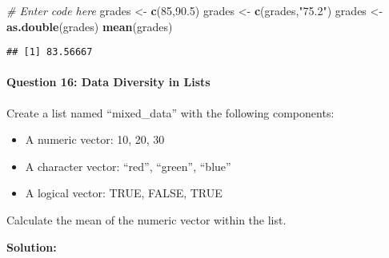 \documentclass[
]{article}
\newenvironment{Shaded}{\begin{snugshade}}{\end{snugshade}}
\newcommand{\AttributeTok}[1]{\textcolor[rgb]{0.13,0.29,0.53}{#1}}
\newcommand{\CommentTok}[1]{\textcolor[rgb]{0.56,0.35,0.01}{\textit{#1}}}
\newcommand{\ConstantTok}[1]{\textcolor[rgb]{0.56,0.35,0.01}{#1}}
\newcommand{\DecValTok}[1]{\textcolor[rgb]{0.00,0.00,0.81}{#1}}
\newcommand{\FloatTok}[1]{\textcolor[rgb]{0.00,0.00,0.81}{#1}}
\newcommand{\FunctionTok}[1]{\textcolor[rgb]{0.13,0.29,0.53}{\textbf{#1}}}
\newcommand{\NormalTok}[1]{#1}
\newcommand{\OtherTok}[1]{\textcolor[rgb]{0.56,0.35,0.01}{#1}}
\newcommand{\SpecialCharTok}[1]{\textcolor[rgb]{0.81,0.36,0.00}{\textbf{#1}}}
\newcommand{\StringTok}[1]{\textcolor[rgb]{0.31,0.60,0.02}{#1}}
\begin{document}
\begin{Shaded}
\begin{Highlighting}[]
\CommentTok{\# Enter code here}
\NormalTok{grades }\OtherTok{\textless{}{-}} \FunctionTok{c}\NormalTok{(}\DecValTok{85}\NormalTok{,}\FloatTok{90.5}\NormalTok{)}
\NormalTok{grades }\OtherTok{\textless{}{-}} \FunctionTok{c}\NormalTok{(grades,}\StringTok{"75.2"}\NormalTok{)}
\NormalTok{grades }\OtherTok{\textless{}{-}} \FunctionTok{as.double}\NormalTok{(grades)}
\FunctionTok{mean}\NormalTok{(grades)}
\end{Highlighting}
\end{Shaded}

\begin{verbatim}
## [1] 83.56667
\end{verbatim}

\hypertarget{question-16-data-diversity-in-lists}{%
\paragraph{Question 16: Data Diversity in
Lists}\label{question-16-data-diversity-in-lists}}

Create a list named ``mixed\_data'' with the following components:

\begin{itemize}
\item
  A numeric vector: 10, 20, 30
\item
  A character vector: ``red'', ``green'', ``blue''
\item
  A logical vector: TRUE, FALSE, TRUE
\end{itemize}

Calculate the mean of the numeric vector within the list.

\textbf{Solution:}

\begin{Shaded}
\end{Shaded}
\end{document}
